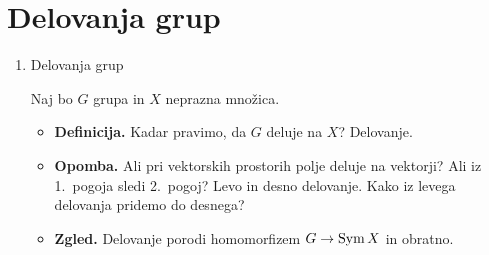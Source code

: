 \section{Delovanja grup}
\begin{enumerate}
    \item Delovanja grup
    
    Naj bo \(G\) grupa in \(X\) neprazna množica.
    \begin{itemize}
        \item \textbf{Definicija.} Kadar pravimo, da \(G\) deluje na \(X\)? Delovanje.
        \item \textbf{Opomba.} Ali pri vektorskih prostorih polje deluje na vektorji? Ali iz 1.\ pogoja sledi 2.\ pogoj? Levo in desno delovanje. Kako iz levega delovanja pridemo do desnega?
        \item \textbf{Zgled.} Delovanje porodi homomorfizem \(G \to \operatorname{Sym} X\) in obratno.
    \end{itemize}
\end{enumerate}